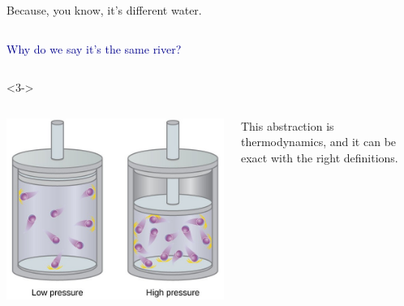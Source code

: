 \documentclass[aspectratio=169]{beamer}
\begin{document}
\begin{frame}{}
\huge
\vspace{0.5 cm}
\begin{center}
Because, you know, it's different water.
\end{center}
\end{frame}

\begin{frame}{}
\Large
\vspace{1.5 cm}
\begin{columns}
\textcolor{darkblue}{\huge Why do we say it's the same river?}

\vspace{0.5 cm}
\end{columns}

\vspace{0.5 cm}
\begin{uncoverenv}<3->
\begin{columns}
\includegraphics[width=\linewidth]{idealgas.jpg}

This abstraction is thermodynamics, and it can be exact with the right definitions.
\end{columns}
\end{uncoverenv}
\end{frame}
\end{document}
